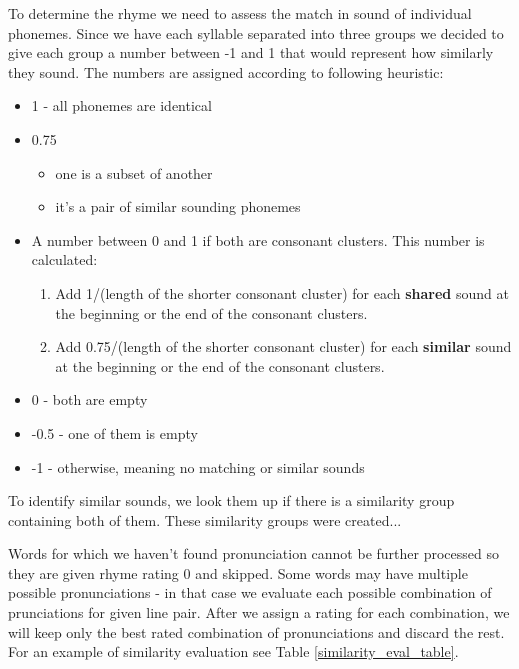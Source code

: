 To determine the rhyme we need to assess the match in sound of individual phonemes. Since we have each syllable separated into three groups we decided to give each group a number between -1 and 1 that would represent how similarly they sound. The numbers are assigned according to following heuristic:
\begin{itemize}
	\item 1 - all phonemes are identical
	\item 0.75
	\begin{itemize}
		\item one is a subset of another
		\item it's a pair of similar sounding phonemes
	\end{itemize}
	\item A number between 0 and 1 if both are consonant clusters. This number is calculated:
	\begin{enumerate}
		\item Add 1/(length of the shorter consonant cluster) for each \textbf{shared} sound at the beginning or the end of the consonant clusters.
		\item Add 0.75/(length of the shorter consonant cluster) for each \textbf{similar} sound at the beginning or the end of the consonant clusters.
	\end{enumerate}
	\item 0 - both are empty
	\item -0.5 - one of them is empty
	\item -1 - otherwise, meaning no matching or similar sounds
	
\end{itemize}

To identify similar sounds, we look them up if there is a similarity group containing both of them. These similarity groups were created... 

Words for which we haven't found pronunciation cannot be further processed so they are given rhyme rating 0 and skipped. Some words may have multiple possible pronunciations - in that case we evaluate each possible combination of prunciations for given line pair. After we assign a rating for each combination, we will keep only the best rated combination of pronunciations and discard the rest. For an example of similarity evaluation see Table \ref{similarity_eval_table}.

